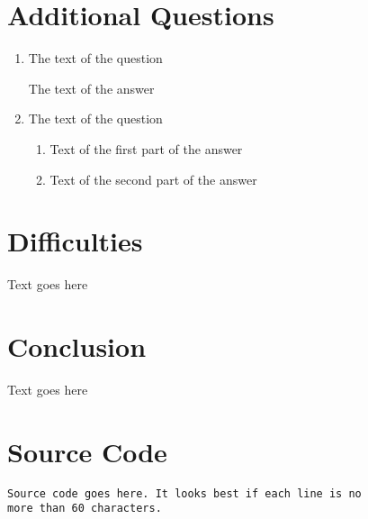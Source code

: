 \documentclass[12pt,letterpaper]{article}
\begin{document}
\section{Additional Questions}
\begin{enumerate}
    \item
    The text of the question

    The text of the answer

    \item
    The text of the question
    \begin{enumerate}
        \item
        Text of the first part of the answer

        \item
        Text of the second part of the answer
    \end{enumerate}

\end{enumerate}

\section{Difficulties}
Text goes here

\section{Conclusion}
Text goes here

\section{Source Code}
\begin{verbatim}
Source code goes here. It looks best if each line is no
more than 60 characters.
\end{verbatim}
\end{document}
